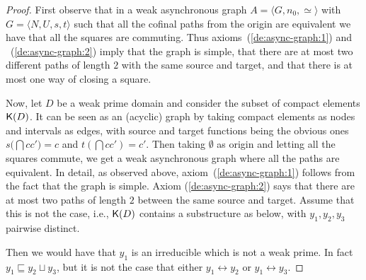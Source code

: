 \begin{proof}
  First observe that in a weak asynchronous graph
  $A = \langle G, n_0, \simeq \rangle$ with
  $G = \langle N, U, s, t \rangle$ such that all the {cofinal} paths from the
  origin are equivalent we have that all the squares are commuting. Thus
  axioms~(\ref{de:async-graph:1}) and ~(\ref{de:async-graph:2}) imply that the graph
  is simple, that there are at most two different paths of length $2$ with
  the same source and target, and that there is at most one way of
  closing a square.
  

  
  Now, let $D$ be a weak prime domain and consider the subset of compact
  elements $\mathop{\mathsf{K}({D})}$. It can be seen as an (acyclic) graph by taking compact
  elements as nodes and intervals as edges, with source and target
  functions being the obvious ones $s(\dint{c}{c'}{)} = c$ and
  $t(\dint{c}{c'}) = c'$.
  Then taking $\emptyset$ as origin and letting all the squares commute,
  we get a weak asynchronous graph where all the paths are equivalent.
  In detail, as observed above, axiom~(\ref{de:async-graph:1}) follows
  from the fact that the graph is simple. 
  Axiom (\ref{de:async-graph:2}) says that there are at most two
  paths of length $2$ between the same source and target. Assume that this
  is not the case, i.e., $\mathop{\mathsf{K}({D})}$ contains a substructure as below, with $y_1, y_2, y_3$ pairwise distinct.
  \begin{center}
  \end{center}
  Then we would have that $y_1$ is an irreducible which is not a weak
  prime. In fact $y_1 \sqsubseteq y_2 \sqcup y_3$, but it is not the
  case that either $y_1 \leftrightarrow y_2$ or $y_1 \leftrightarrow y_3$.


\end{proof}
